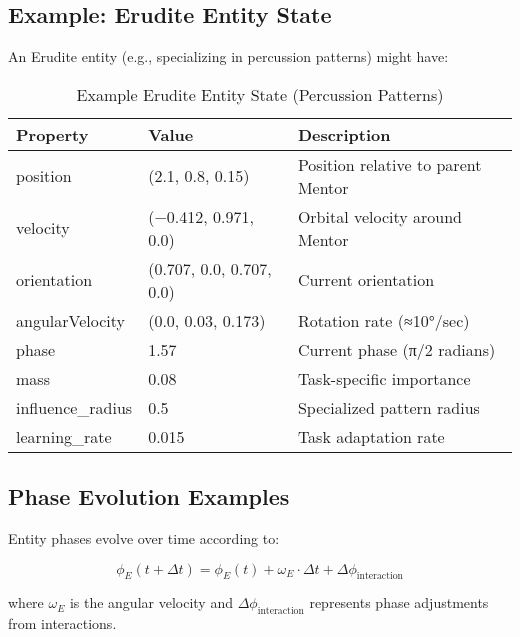 \subsection{Example: Erudite Entity State}

An Erudite entity (e.g., specializing in percussion patterns) might have:

\begin{table}[h]
\centering
\begin{tabular}{|l|l|l|}
\hline
\textbf{Property} & \textbf{Value} & \textbf{Description} \\
\hline
position & (2.1, 0.8, 0.15) & Position relative to parent Mentor \\
velocity & (−0.412, 0.971, 0.0) & Orbital velocity around Mentor \\
orientation & (0.707, 0.0, 0.707, 0.0) & Current orientation \\
angularVelocity & (0.0, 0.03, 0.173) & Rotation rate (≈10°/sec) \\
phase & 1.57 & Current phase (π/2 radians) \\
mass & 0.08 & Task-specific importance \\
influence\_radius & 0.5 & Specialized pattern radius \\
learning\_rate & 0.015 & Task adaptation rate \\
\hline
\end{tabular}
\caption{Example Erudite Entity State (Percussion Patterns)}
\end{table}

\subsection{Phase Evolution Examples}

Entity phases evolve over time according to:

\begin{equation}
\phi_E(t+\Delta t) = \phi_E(t) + \omega_E \cdot \Delta t + \Delta \phi_{\text{interaction}}
\end{equation}

where $\omega_E$ is the angular velocity and $\Delta \phi_{\text{interaction}}$ represents phase adjustments from interactions.

